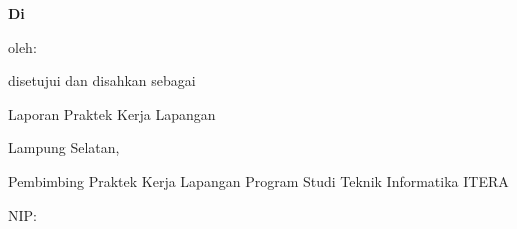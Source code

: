 \setcounter{page}{1}
\pagestyle{plain}
\thispagestyle{plain}

\begin{center}
\spasisetengah
{}
\vspace{12pt}

\textbf{\TopikKP}\par
\vspace{12pt}
\textbf{Di \NamaPerusahaan}\par
\vspace{6pt}
oleh:\par
\vspace{6pt}
\NamaMhs\par
\NIM\par
\vspace{36pt}
disetujui dan disahkan sebagai\par
Laporan Praktek Kerja Lapangan\par
\end{center}

\vspace{6pt}
\noindent\begin{minipage}{0.62\textwidth}\raggedright\parindent=0pt\parskip=0pt
Lampung Selatan, \TanggalPengesahanProdi\par
Pembimbing Praktek Kerja Lapangan Program Studi Teknik Informatika ITERA\par
\pet{}\par
\vspace{1.2cm}
\NamaPembimbingProdi\par
NIP: \NIPPembimbingProdi\par
\end{minipage}
